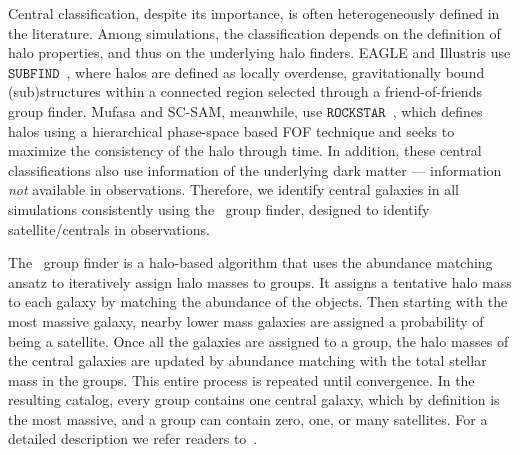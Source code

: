 \documentclass[tighten, preprint]{aastex62}
\begin{document}
Central classification, despite its importance, is often 
heterogeneously defined in the literature. Among simulations, the 
classification depends on the definition of halo properties, 
and thus on the underlying halo finders. EAGLE and Illustris use 
$\mathtt{SUBFIND}$~\citep{springel2001}, where halos are defined as 
locally overdense, gravitationally bound (sub)structures within a 
connected region selected through a 
friend-of-friends~\citep[FOF;][]{davis1985} group finder. {\sc Mufasa} 
and SC-SAM, meanwhile, use 
$\mathtt{ROCKSTAR}$~\citep{behroozi2013}, which defines halos using a
hierarchical phase-space based FOF technique and seeks to maximize 
the consistency of the halo through time. In addition, these central 
classifications also use information of the underlying dark 
matter --- information {\em not} available in observations. Therefore, 
we identify central galaxies in all simulations consistently using %
the~\cite{tinker2011} group finder, designed to identify satellite/centrals 
in observations. 

The~\cite{tinker2011} group finder is a halo-based algorithm that uses 
the abundance matching ansatz to iteratively assign halo masses to groups. 
It assigns a tentative halo mass to each galaxy by matching the abundance 
of the objects. Then starting with the most massive galaxy, nearby lower
mass galaxies are assigned a probability of being a satellite. Once all 
the galaxies are assigned to a group, the halo masses of the central galaxies 
are updated by abundance matching with the total stellar mass in the groups. 
This entire process is repeated until convergence. In the resulting catalog, 
every group contains one central galaxy, which by definition is the 
most massive, and a group can contain zero, one, or many satellites.
For a detailed description we refer readers to~\cite{tinker2011,wetzel2012}.
\end{document}

